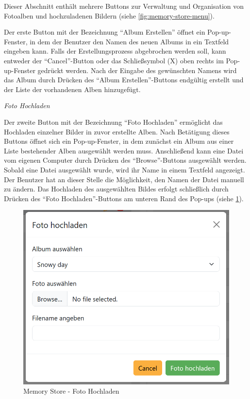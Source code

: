 Dieser Abschnitt enthält mehrere Buttons zur Verwaltung und Organisation von Fotoalben und hochzuladenen Bildern (siehe \ref{fig:memory-store-menu}).

Der erste Button mit der Bezeichnung ``Album Erstellen'' öffnet ein Pop-up-Fenster, in dem der Benutzer den Namen des neuen Albums in ein Textfeld eingeben kann. Falls der Erstellungsprozess abgebrochen werden soll, kann entweder der ``Cancel''-Button oder das Schlie\ss{}symbol (X) oben rechts im Pop-up-Fenster gedrückt werden. Nach der Eingabe des gewünschten Namens wird das Album durch Drücken des ``Album Erstellen''-Buttons endgültig erstellt und der Liste der vorhandenen Alben hinzugefügt.


{\textit{Foto Hochladen}}

Der zweite Button mit der Bezeichnung ``Foto Hochladen'' ermöglicht das Hochladen einzelner Bilder in zuvor erstellte Alben. Nach Betätigung dieses Buttons öffnet sich ein Pop-up-Fenster, in dem zunächst ein Album aus einer Liste bestehender Alben ausgewählt werden muss. Anschlie\ss{}end kann eine Datei vom eigenen Computer durch Drücken des ``Browse''-Buttons ausgewählt werden. Sobald eine Datei ausgewählt wurde, wird ihr Name in einem Textfeld angezeigt. Der Benutzer hat an dieser Stelle die Möglichkeit, den Namen der Datei manuell zu ändern. Das Hochladen des ausgewählten Bildes erfolgt schlie\ss{}lich durch Drücken des ``Foto Hochladen''-Buttons am unteren Rand des Pop-ups (siehe \ref{fig:memory-store-foto-hochladen}).

\begin{figure}
    \centering
    \includegraphics[scale=0.4]{pics/memory_store_teil1_button2.PNG}
    \caption{Memory Store - Foto Hochladen}
    \label{fig:memory-store-foto-hochladen}
\end{figure}



